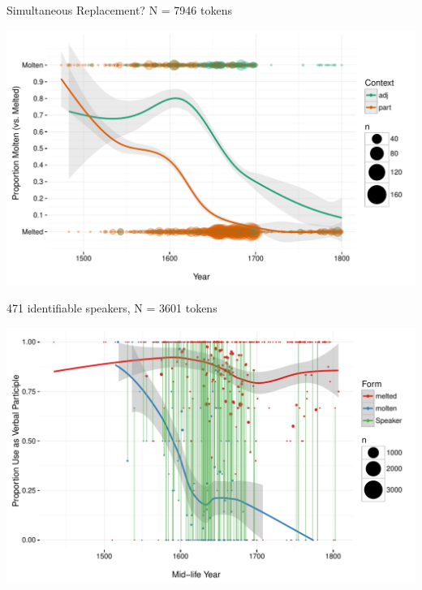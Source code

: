 \documentclass[hyperref={pdfpagelabels=false}]{beamer}
\begin{document}
\begin{frame}{Simultaneous Replacement? N =  7946 tokens}

\includegraphics[width=1.128\textwidth]{FormByDateUnbinnedWithDots2.pdf}
\end{frame}




\begin{frame}{471 identifiable speakers, N = 3601 tokens}

\begin{center}
\includegraphics[width=1.128\textwidth]{ContextByDateAuthor.pdf}
\end{center}%
\end{frame}
\end{document}
